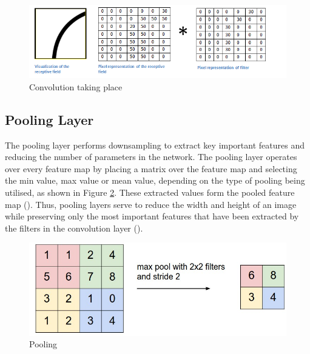 \documentclass[12pt]{report}
\begin{document}
\vspace{0.5cm}
\begin{figure}[ht!]
	\centering
	\includegraphics[width=12cm]{conv}
	\caption{Convolution taking place}
	\label{fig:conv}
\end{figure}

\newpage
\subsection{Pooling Layer}
\begin{flushleft}
The pooling layer performs downsampling to extract key important features and reducing the number of parameters in the network. The pooling layer operates over every feature map by placing a matrix over the feature map and selecting the min value, max value or mean value, depending on the type of pooling being utilised, as shown in Figure \ref{fig:pool}. These extracted values form the pooled feature map (\cite{o2015introduction}). Thus, pooling layers serve to reduce the width and height of an image while preserving only the most important features that have been extracted by the filters in the convolution layer (\cite{zhao2019object}).
\end{flushleft}

\vspace{0.5cm}
\begin{figure}[ht!]
	\centering
	\includegraphics[width=12cm]{pool}
	\caption{Pooling}
	\label{fig:pool}
\end{figure}
\end{document}
